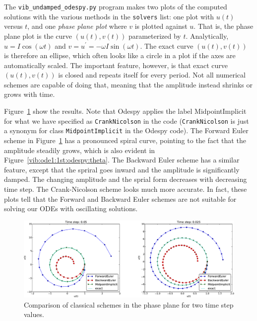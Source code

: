 \documentclass[%
oneside,                 %
final,                   %
10pt]{article}
\begin{document}

The \Verb!vib_undamped_odespy.py!
program makes two plots of the computed solutions with the various
methods in the \texttt{solvers} list: one plot with $u(t)$ versus $t$, and
one \emph{phase plane plot} where $v$ is plotted against $u$.
That is, the phase plane plot is the curve $(u(t),v(t))$ parameterized
by $t$. Analytically, $u=I\cos(\omega t)$ and $v=u^{\prime}=-\omega I\sin(\omega t)$.
The exact curve $(u(t),v(t))$ is therefore an ellipse, which often
looks like a circle in a plot if the axes are automatically scaled. The
important feature, however, is that exact curve $(u(t),v(t))$ is
closed and repeats itself for every period. Not all numerical schemes
are capable of doing that, meaning that the amplitude instead shrinks or
grows with time.

Figure~\ref{vib:ode1:1st:odespy:theta:phaseplane} show the results. Note that
Odespy applies the label MidpointImplicit for what we have specified
as \texttt{CrankNicolson} in the code (\texttt{CrankNicolson} is just a synonym for
class \texttt{MidpointImplicit} in the Odespy code).
The Forward Euler scheme in Figure~\ref{vib:ode1:1st:odespy:theta:phaseplane} has a pronounced spiral
curve, pointing to the fact that the amplitude steadily grows, which
is also evident in Figure~\ref{vib:ode1:1st:odespy:theta}.
The Backward Euler scheme has a similar feature, except that the
spriral goes inward and the amplitude is significantly damped.  The
changing amplitude and the sprial form decreases with decreasing time
step.  The Crank-Nicolson scheme looks much more
accurate.  In fact, these plots tell that the Forward and Backward
Euler schemes are not suitable for solving our ODEs with oscillating
solutions.


\begin{figure}[!ht]  %
  \centerline{\includegraphics[width=1.0\linewidth]{fig-vib/vib_theta_1_pp.pdf}}
  \caption{
  Comparison of classical schemes in the phase plane for two time step values. \label{vib:ode1:1st:odespy:theta:phaseplane}
  }
\end{figure}
\end{document}
